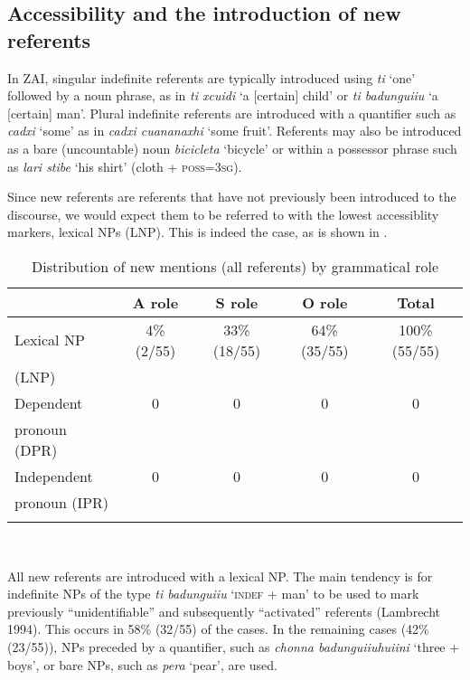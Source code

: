 \subsection{Accessibility and the introduction of new referents}\label{accessiblityandnew}

In ZAI, singular indefinite referents are typically introduced using \textit{ti} `one' followed by a noun phrase, as in \textit{ti xcuidi} `a {[}certain{]} child' or \textit{ti badunguiiu} `a {[}certain{]} man'. Plural indefinite referents are introduced with a quantifier such as \textit{cadxi} `some' as in \textit{cadxi cuananaxhi} `some fruit'. Referents may also be introduced as a bare (uncountable) noun \textit{bicicleta} `bicycle'  or within a possessor phrase such as \textit{lari stibe} `his shirt' (cloth + \textsc{poss}=3\textsc{sg}).


Since new referents are referents that have not previously been introduced to the discourse, we would expect them to be referred to with the lowest accessiblity markers, lexical NPs (LNP). This is indeed the case, as is shown in .

\begin{table}  

\caption{{Distribution of new mentions (all referents) by grammatical role}}
\begin{tabular}{ l  c  c  c  c }
\lsptoprule
 & A role & S role & O role & Total\\

\midrule
  {Lexical NP} & 4{\%} (2/55) & 33{\%} (18/55) & 64{\%} (35/55) & 100{\%} (55/55) \\
 (LNP) & & & & \\

\midrule
  {Dependent} & 0 & 0  &  0 &  0  \\
pronoun (DPR) & & & & \\

\midrule
  {Independent} & 0 & 0  & 0 &  0 \\
 pronoun (IPR) & & & & \\

\lspbottomrule
\end{tabular}\\
\label{newreferents}

\end{table} 
All new referents are introduced with a lexical NP. The main tendency is for indefinite NPs of the type \textit{ti badunguiiu} {`}\textsc{indef} + man{'} to be used to mark previously ``unidentifiable'' and subsequently ``activated'' referents (Lambrecht 1994). This occurs in 58{\%} (32/55) of the cases. In the remaining cases (42{\%} (23/55)), NPs preceded by a quantifier, such as \textit{chonna badunguiiuhuiini} {`}three + boys{'}, or bare NPs, such as \textit{pera} `pear', are used. 

